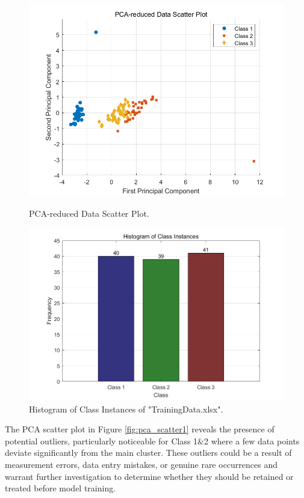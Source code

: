 \documentclass[12pt, onecolumn]{article}
\begin{document}
\begin{figure}[htbp]
\centering
\begin{minipage}[b]{0.48\linewidth}
\includegraphics[width=\linewidth]{1.png}
\caption{PCA-reduced Data Scatter Plot.}
\label{fig:pca_scatter1}
\end{minipage}
\hfill
\begin{minipage}[b]{0.48\linewidth}
\includegraphics[width=\linewidth]{2.png}
\caption{Histogram of Class Instances of "TrainingData.xlsx".}
\label{fig:class_histogram1}
\end{minipage}
\end{figure}

The PCA scatter plot in Figure \ref{fig:pca_scatter1} reveals the presence of potential outliers, particularly noticeable for Class 1$\&$2 where a few data points deviate significantly from the main cluster. These outliers could be a result of measurement errors, data entry mistakes, or genuine rare occurrences and warrant further investigation to determine whether they should be retained or treated before model training.
\end{document}
